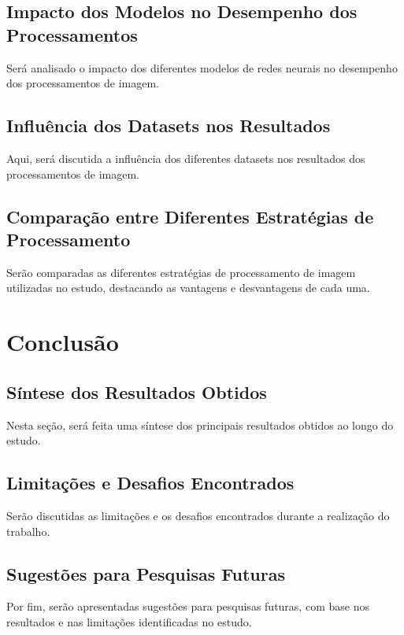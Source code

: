 \section{Impacto dos Modelos no Desempenho dos Processamentos}
Será analisado o impacto dos diferentes modelos de redes neurais no desempenho dos processamentos de imagem.

\section{Influência dos Datasets nos Resultados}
Aqui, será discutida a influência dos diferentes datasets nos resultados dos processamentos de imagem.

\section{Comparação entre Diferentes Estratégias de Processamento}
Serão comparadas as diferentes estratégias de processamento de imagem utilizadas no estudo, destacando as vantagens e desvantagens de cada uma.

\chapter{Conclusão}
\section{Síntese dos Resultados Obtidos}
Nesta seção, será feita uma síntese dos principais resultados obtidos ao longo do estudo.

\section{Limitações e Desafios Encontrados}
Serão discutidas as limitações e os desafios encontrados durante a realização do trabalho.

\section{Sugestões para Pesquisas Futuras}
Por fim, serão apresentadas sugestões para pesquisas futuras, com base nos resultados e nas limitações identificadas no estudo.
